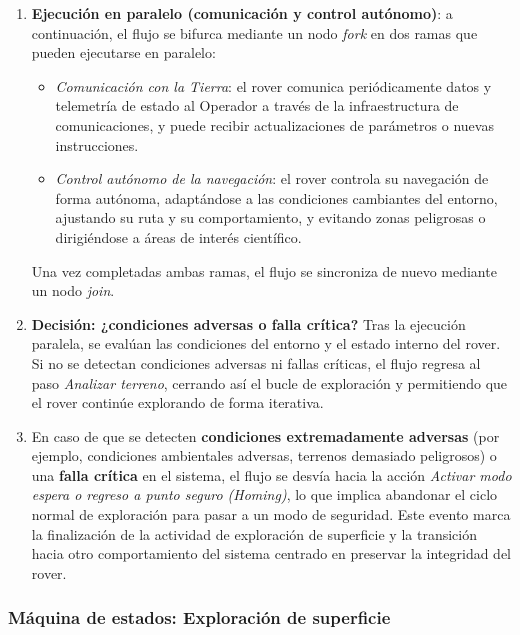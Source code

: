 \begin{enumerate}
  \item \textbf{Ejecución en paralelo (comunicación y control autónomo)}: a continuación, el flujo
        se bifurca mediante un nodo \textit{fork} en dos ramas que pueden ejecutarse en paralelo:
        \begin{itemize}
          \item \textit{Comunicación con la Tierra}: el rover comunica periódicamente datos y
                telemetría de estado al Operador a través de la infraestructura de comunicaciones,
                y puede recibir actualizaciones de parámetros o nuevas instrucciones.
          \item \textit{Control autónomo de la navegación}: el rover controla su navegación de forma
                autónoma, adaptándose a las condiciones cambiantes del entorno, ajustando su ruta
                y su comportamiento, y evitando zonas peligrosas o dirigiéndose a áreas de interés
                científico.
        \end{itemize}
        Una vez completadas ambas ramas, el flujo se sincroniza de nuevo mediante un nodo
        \textit{join}.

  \item \textbf{Decisión: ¿condiciones adversas o falla crítica?} Tras la ejecución paralela, se
        evalúan las condiciones del entorno y el estado interno del rover. Si no se detectan
        condiciones adversas ni fallas críticas, el flujo regresa al paso \textit{Analizar terreno},
        cerrando así el bucle de exploración y permitiendo que el rover continúe explorando de
        forma iterativa.

  \item En caso de que se detecten \textbf{condiciones extremadamente adversas} (por ejemplo,
        condiciones ambientales adversas, terrenos demasiado peligrosos) o una \textbf{falla crítica} en el
        sistema, el flujo se desvía hacia la acción \textit{Activar modo espera o regreso a punto
        seguro (Homing)}, lo que implica abandonar el ciclo normal de exploración para pasar a un
        modo de seguridad. Este evento marca la finalización de la actividad de exploración de
        superficie y la transición hacia otro comportamiento del sistema centrado en preservar la
        integridad del rover.
\end{enumerate}


\subsubsection{Máquina de estados: Exploración de superficie}\label{subsec:uc01_states}

